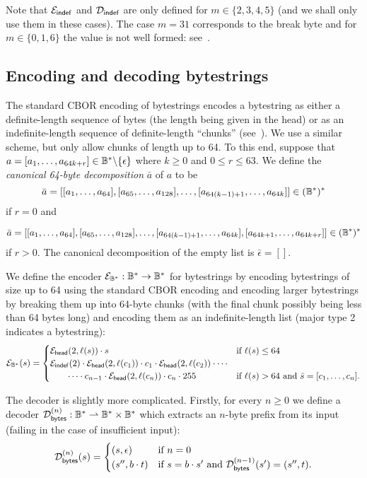 \noindent Note that $\mathcal{E}_{\mathsf{indef}}$ and $\mathcal{D}_{\mathsf{indef}}$ are only defined for $m \in
\{2,3,4,5\}$ (and we shall only use them in these cases). The case $m=31$
corresponds to the break byte and for $m \in \{0,1,6\}$ the value is not well
formed: see~\cite[3.2.4]{rfc8949-CBOR}.

\subsection{Encoding and decoding bytestrings}
The standard CBOR encoding of bytestrings encodes a bytestring as either a
definite-length sequence of bytes (the length being given in the head) or as an
indefinite-length sequence of definite-length ``chunks'' (see~\cite[\S\S3.1 and
  3.4.2]{rfc8949-CBOR}).  We use a similar scheme, but only allow chunks of
length up to 64.  To this end, suppose that $a = [a_1, \ldots, a_{64k+r}] \in
\mathbb{B}^*\backslash\{\epsilon\}$ where $k \geq 0$ and $0 \leq r \leq 63$.  We define
the \textit{canonical 64-byte decomposition} $\bar{a}$ of $a$ to be
$$
\bar{a} = [[a_1, \ldots, a_{64}],
  [a_{65}, \ldots, a_{128}] ,\ldots, 
  [a_{64(k-1)+1}, \ldots, a_{64k}]] \in (\mathbb{B}^*)^*
$$
\noindent if $r=0$ and

$$
\bar{a} = [[a_1, \ldots, a_{64}],
  [a_{65}, \ldots, a_{128}], \ldots, 
  [a_{64(k-1)+1}, \ldots, a_{64k}], [a_{64k+1}, \ldots, a_{64k+r}]] \in (\mathbb{B}^*)^*
$$
\noindent if $r>0$.  The canonical decomposition of the empty list is $\bar{\epsilon} = []$.

\medskip
\noindent We define the encoder $\mathcal{E}_{\mathbb{B}^*}: \mathbb{B}^* \rightarrow \mathbb{B}^*$ for bytestrings by
encoding bytestrings of size up to 64 using the standard CBOR encoding and
encoding larger bytestrings by breaking them up into 64-byte chunks (with the
final chunk possibly being less than 64 bytes long) and encoding them as an
indefinite-length list (major type 2 indicates a bytestring):
$$ \mathcal{E}_{\mathbb{B}^*}(s) =
\begin{cases}
  \mathcal{E}_{\mathsf{head}}(2,\operatorname{\ell}(s)) \cdot s & \text{if $\operatorname{\ell}(s) \leq 64$}\\
  \mathcal{E}_{\mathsf{indef}}(2) \cdot \mathcal{E}_{\mathsf{head}}(2,\operatorname{\ell}(c_1)) \cdot c_1 \cdot \mathcal{E}_{\mathsf{head}}(2,\operatorname{\ell}(c_2)) \cdot \cdots \\
  \qquad  \cdots  \cdot c_{n-1} \cdot \mathcal{E}_{\mathsf{head}}(2,\operatorname{\ell}(c_n)) \cdot c_n \cdot 255
  & \text{if $\operatorname{\ell}(s) > 64$ and $\bar{s} = [c_1, \ldots, c_n]$.}
\end{cases}
$$

\medskip

\noindent The decoder is slightly more complicated.  Firstly, for every $n \geq
0$ we define a decoder $\mathcal{D}_{\mathsf{bytes}}^{(n)}: \mathbb{B}^* \rightharpoonup \mathbb{B}^* \times \mathbb{B}^*$
which extracts an $n$-byte prefix from its input (failing in the case of
insufficient input):
$$
\mathcal{D}_{\mathsf{bytes}}^{(n)}(s) =
\begin{cases}
  (s, \epsilon) & \text{if $n=0$}\\
  (s'', b \cdot t) & \text{if $s = b \cdot s'$ and $\mathcal{D}_{\mathsf{bytes}}^{(n-1)}(s') = (s'', t)$}.
\end{cases}
$$

